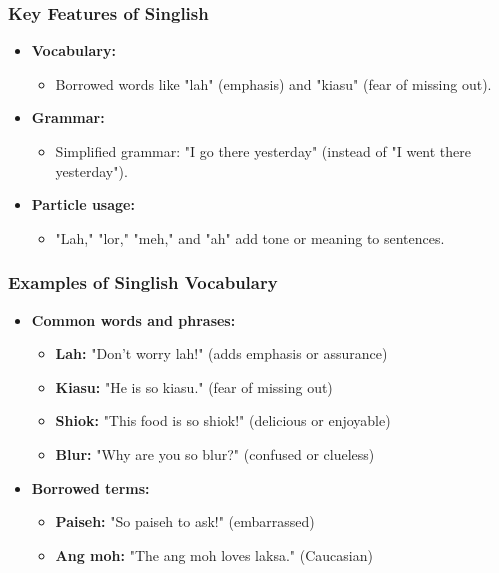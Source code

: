 \documentclass{beamer}
\begin{document}
\begin{frame}
\frametitle{Key Features of Singlish}
\begin{itemize}
    \item \textbf{Vocabulary:}
    \begin{itemize}
        \item Borrowed words like "lah" (emphasis) and "kiasu" (fear of missing out).
    \end{itemize}
    \item \textbf{Grammar:}
    \begin{itemize}
        \item Simplified grammar: "I go there yesterday" (instead of "I went there yesterday").
    \end{itemize}
    \item \textbf{Particle usage:}
    \begin{itemize}
        \item "Lah," "lor," "meh," and "ah" add tone or meaning to sentences.
    \end{itemize}
\end{itemize}
\end{frame}

\begin{frame}
\frametitle{Examples of Singlish Vocabulary}
\begin{itemize}
    \item \textbf{Common words and phrases:}
    \begin{itemize}
        \item \textbf{Lah:} "Don't worry lah!" (adds emphasis or assurance)
        \item \textbf{Kiasu:} "He is so kiasu." (fear of missing out)
        \item \textbf{Shiok:} "This food is so shiok!" (delicious or enjoyable)
        \item \textbf{Blur:} "Why are you so blur?" (confused or clueless)
    \end{itemize}
    \item \textbf{Borrowed terms:}
    \begin{itemize}
        \item \textbf{Paiseh:} "So paiseh to ask!" (embarrassed)
        \item \textbf{Ang moh:} "The ang moh loves laksa." (Caucasian)
    \end{itemize}
\end{itemize}
\end{frame}
\end{document}

